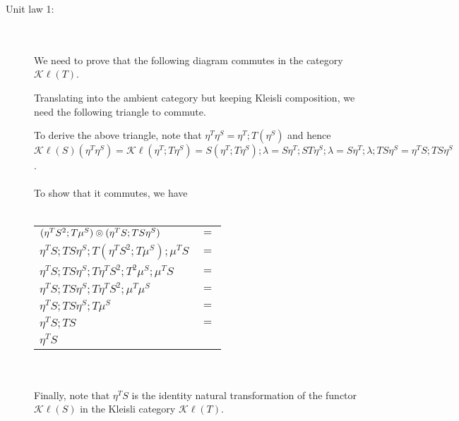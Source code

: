 \documentclass{article}
\begin{document}
\begin{description}

\item[Unit law 1:]~\\~\\
We need to prove that the following diagram commutes in the category $\mathcal K \ell (T)$.
\begin{center}
\end{center}
Translating into the ambient category but keeping Kleisli composition, we need the following triangle to commute.

\begin{center}
\end{center} 
 
To derive the above triangle, note that $\eta^T \eta^S = \eta^T;T(\eta^S)$ and hence 
$\mathcal K \ell(S)(\eta^T \eta^S) = \mathcal K \ell (\eta^T;T\eta^S) = S(\eta^T;T\eta^S);\lambda
 = S\eta^T;ST\eta^S;\lambda = S \eta^T;\lambda;TS \eta^S = \eta^TS;TS \eta^S$.\\~\\
To show that it commutes, we have\\~\\
\begin{tabular}{ll}
$(\eta^T S^2;T\mu^S) \ocircle (\eta^{T}S;TS \eta^S)$ & $=$ \\ 
$\eta^{T}S;TS\eta^S;T(\eta^TS^2;T\mu^S);\mu^TS$ & $=$ \\
$\eta^{T}S;TS\eta^S;T\eta^TS^2;T^2\mu^S;\mu^TS$ & $=$ \\
$\eta^{T}S;TS\eta^S;T\eta^TS^2;\mu^T \mu^S$ & $=$ \\
$\eta^{T}S;TS\eta^S;T \mu^S$ & $=$ \\
$\eta^{T}S;TS$ & $=$ \\
$\eta^T S$
\end{tabular}\\~\\
Finally, note that $\eta^T S$ is the identity natural transformation of the functor $\mathcal K \ell(S)$ in 
the Kleisli category $\mathcal K \ell(T)$.


\end{description}
\end{document}

